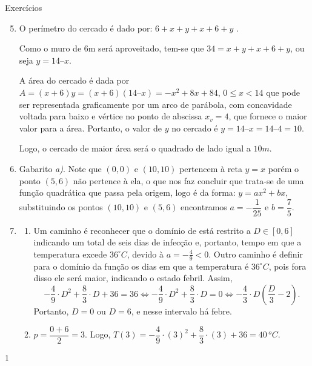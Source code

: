 \clearmargin
\begin{answer}{Exercícios}
{\exerciselist
\begin{enumerate}\setcounter{enumi}{4}
\item 
{}
{
}

O perímetro do cercado é dado por: \(6+x+y+x+6+y\) .

Como o muro de 6m será aproveitado, tem-se que \(34=x+y+x+6+y\), ou seja \(y=14–x\).

A área do cercado é dada por \(A= (x + 6)y = (x + 6)(14 – x) = -x^2 + 8x + 84\), \(0 \leq x <14\) que pode ser representada graficamente  por um arco de parábola, com concavidade voltada para baixo e vértice no ponto de abscissa \(x_v=4\), que fornece o maior valor para a área. Portanto, o valor de \(y\) no cercado é \(y = 14 – x = 14 – 4 = 10\).

Logo, o cercado de maior área será o quadrado de lado igual a \(10m\).


\item Gabarito \textit{a)}. Note que \((0,0)\) e \((10,10)\) pertencem à reta \(y=x\) porém o ponto \((5,6)\) não pertence à ela, o que nos faz concluir que trata-se de uma função quadrática que passa pela origem, logo é da forma: \(y=ax^2+bx\), substituindo os pontos \((10,10)\) e \((5,6)\) encontramos \(a=-\dfrac{1}{25}\) e \(b=\dfrac{7}{5}\).


\item 
\begin{enumerate}[wide]
\item Um caminho é reconhecer que o domínio de está restrito a \(D \in [0,6]\) indicando um total de seis dias de infecção e, portanto, tempo em que a temperatura excede \(36^{\circ}C\), devido à \(a=-\frac{4}{9} <0\). Outro caminho é definir para o domínio da função os dias em que a temperatura é \(36^{\circ}C\), pois fora disso ele será maior, indicando o estado febril. Assim, \small
\begin{equation*}
-\frac{4}{9} \cdot D^2 + \frac{8}{3} \cdot D + 36 = 36 \iff -\frac{4}{9} \cdot D^2 + \frac{8}{3} \cdot D = 0 \iff -\frac{4}{3} \cdot D \left( \frac{D}{3}-2 \right) .
\end{equation*}\normalsize
Portanto, \(D=0\) ou \(D=6\), e nesse intervalo há febre.


\item \(p=\dfrac{0+6}{2}=3\). Logo, \(T(3)=-\dfrac{4}{9} \cdot (3)^2 + \dfrac{8}{3} \cdot (3) + 36 = 40 \, ^{o}C\).
\end{enumerate}
\end{enumerate}
}{1}
\end{answer}
